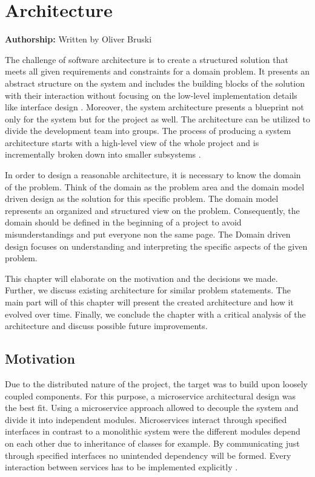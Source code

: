 \section{Architecture}\label{sec:architecture}

\textbf{Authorship: } Written by Oliver Bruski\\

\vspace*{4mm}


The challenge of software architecture is to create a structured
solution that meets all given requirements and constraints for a domain
problem. It presents an abstract structure on the system and includes
the building blocks of the solution with their interaction without
focusing on the low-level implementation details like interface design
\cite{Garlan&Shaw.1994}. Moreover, the system architecture presents a blueprint
not only for the system but for the project as well. The architecture
can be utilized to divide the development team into groups. The process
of producing a system architecture starts with a high-level view of the
whole project and is incrementally broken down into smaller subsystems
\cite{Bass&Clements&Kazmann.2012}.

In order to design a reasonable architecture, it is necessary to know
the domain of the problem. Think of the domain as the problem area and
the domain model driven design as the solution for this specific
problem. The domain model represents an organized and structured view on
the problem. Consequently, the domain should be defined in the beginning
of a project to avoid misunderstandings and put everyone non the same page. The Domain driven design focuses on
understanding and interpreting the specific aspects of the given
problem.

This chapter will elaborate on the motivation and the decisions we made.
Further, we discuss existing architecture for similar problem
statements. The main part will of this chapter will present the created
architecture and how it evolved over time. Finally, we conclude the
chapter with a critical analysis of the architecture and discuss
possible future improvements.

\subsection{Motivation}\label{motivation}

Due to the distributed nature of the project, the target was to build
upon loosely coupled components. For this purpose, a microservice
architectural design was the best fit. Using a microservice approach
allowed to decouple the system and divide it into independent modules.
Microservices interact through specified interfaces in contrast to a
monolithic system were the different modules depend on each other due to
inheritance of classes for example. By communicating just through
specified interfaces no unintended dependency will be formed. Every
interaction between services has to be implemented explicitly \cite{Wolff.2016}.

